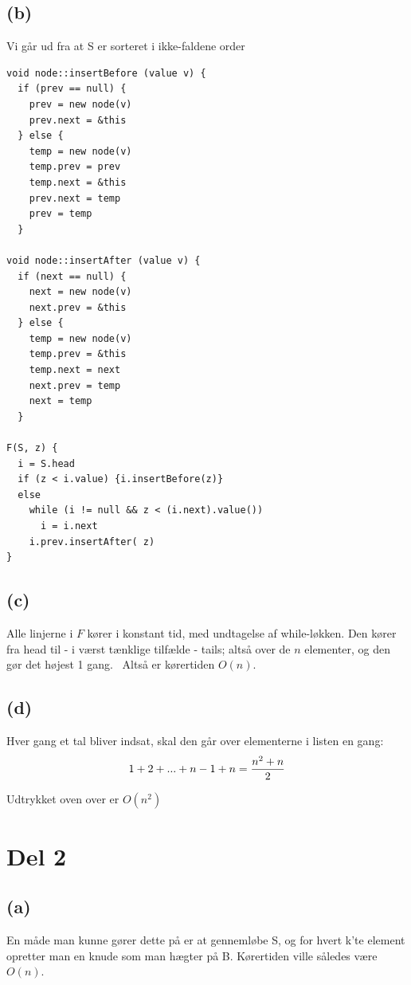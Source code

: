 \documentclass[12pt, a4paper, hidelinks]{article}
\begin{document}
\subsection{(b)}

Vi går ud fra at S er sorteret i ikke-faldene order \\
\begin{lstlisting}
void node::insertBefore (value v) {
  if (prev == null) {
    prev = new node(v)
    prev.next = &this
  } else {
    temp = new node(v)
    temp.prev = prev
    temp.next = &this
    prev.next = temp
    prev = temp    
  }

void node::insertAfter (value v) {
  if (next == null) {
    next = new node(v)
    next.prev = &this
  } else {
    temp = new node(v)
    temp.prev = &this
    temp.next = next 
    next.prev = temp
    next = temp    
  }

F(S, z) {
  i = S.head
  if (z < i.value) {i.insertBefore(z)}
  else 
    while (i != null && z < (i.next).value())
      i = i.next
    i.prev.insertAfter( z)
} 
\end{lstlisting}

\subsection{(c)}

Alle linjerne i   $F$ kører i konstant tid, med undtagelse af while-løkken. Den kører fra head til - i værst tænklige tilfælde - tails; altså over de $n$ elementer, og den gør det højest 1 gang. \
Altså er kørertiden $O(n)$.

\subsection{(d)}

Hver gang et tal bliver indsat, skal den går over elementerne i listen en gang: \\
\[ 1+2+...+ n - 1 + n = {n^2 + n \over 2}\]

Udtrykket oven over er $O(n^2)$

\section{Del 2}

\subsection{(a)}

En måde man kunne gører dette på er at gennemløbe S, og for hvert k'te element opretter man en knude som man hægter på B. Kørertiden ville således være $O(n)$.
\end{document}
